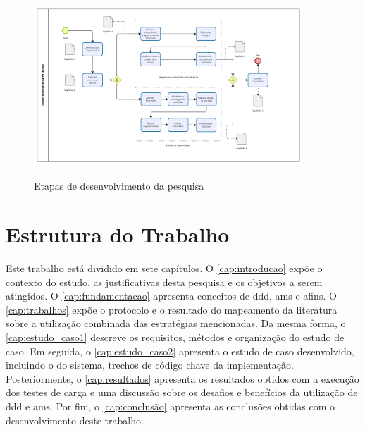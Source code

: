 \vfill

\begin{figure}[ht!]
    \centering
    \caption{Etapas de desenvolvimento da pesquisa}
    \includegraphics[width=0.9\textwidth]{media/bpmn_metodo_recurso.png}
    \label{fig:metodo_recurso}
\end{figure}

\section{Estrutura do Trabalho}

Este trabalho está dividido em sete capítulos.  O \autoref{cap:introducao} expõe o contexto do estudo, as justificativas desta pesquisa e os objetivos a serem atingidos. O \autoref{cap:fundamentacao} apresenta conceitos de \acrshort{ddd}, \acrshort{ams} e afins. O \autoref{cap:trabalhos} expõe o protocolo e o resultado do mapeamento da literatura sobre a utilização combinada das estratégias mencionadas. Da mesma forma, o \autoref{cap:estudo_caso1} descreve os requisitos, métodos e organização do estudo de caso. Em seguida, o \autoref{cap:estudo_caso2} apresenta o estudo de caso desenvolvido, incluindo o  do sistema, trechos de código chave da implementação. Posteriormente, o \autoref{cap:resultados} apresenta os resultados obtidos com a execução dos testes de carga e uma discussão sobre os desafios e benefícios da utilização de \acrshort{ddd} e \acrshort{ams}. Por fim, o \autoref{cap:conclusão} apresenta as conclusões obtidas com o desenvolvimento deste trabalho.